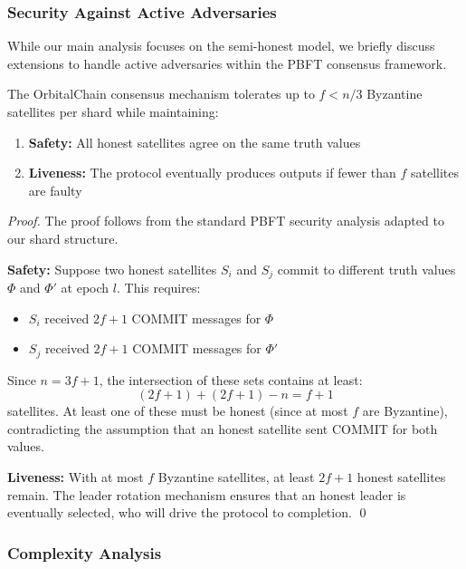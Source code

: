 \subsubsection{Security Against Active Adversaries}

While our main analysis focuses on the semi-honest model, we briefly discuss extensions to handle active adversaries within the PBFT consensus framework.

\begin{theorem}
\label{thm:bft}
The OrbitalChain consensus mechanism tolerates up to $f < n/3$ Byzantine satellites per shard while maintaining:
\begin{enumerate}
    \item \textbf{Safety:} All honest satellites agree on the same truth values
    \item \textbf{Liveness:} The protocol eventually produces outputs if fewer than $f$ satellites are faulty
\end{enumerate}
\end{theorem}

\begin{proof}
The proof follows from the standard PBFT security analysis \cite{castro1999practical} adapted to our shard structure.

\textbf{Safety:} Suppose two honest satellites $S_i$ and $S_j$ commit to different truth values $\Phi$ and $\Phi'$ at epoch $l$. This requires:
\begin{itemize}
    \item $S_i$ received $2f+1$ COMMIT messages for $\Phi$
    \item $S_j$ received $2f+1$ COMMIT messages for $\Phi'$
\end{itemize}

Since $n = 3f+1$, the intersection of these sets contains at least:
\begin{equation}
(2f+1) + (2f+1) - n = f+1
\end{equation}
satellites. At least one of these must be honest (since at most $f$ are Byzantine), contradicting the assumption that an honest satellite sent COMMIT for both values.

\textbf{Liveness:} With at most $f$ Byzantine satellites, at least $2f+1$ honest satellites remain. The leader rotation mechanism ensures that an honest leader is eventually selected, who will drive the protocol to completion. \qed
\end{proof}

\subsubsection{Complexity Analysis}

